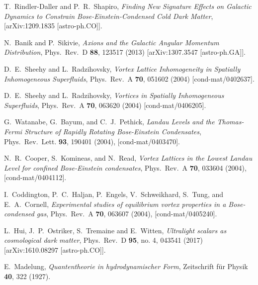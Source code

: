 \documentclass[aps,prd,twocolumn,nofootinbib,superscriptaddress]{revtex4-1}
\begin{document}
\begin{thebibliography}{99}
  T.~Rindler-Daller and P.~R.~Shapiro,
  \emph{Finding New Signature Effects on Galactic Dynamics to Constrain Bose-Einstein-Condensed Cold Dark Matter},
  [arXiv:1209.1835 [astro-ph.CO]].

  N.~Banik and P.~Sikivie,
  \emph{Axions and the Galactic Angular Momentum Distribution},
  Phys.\ Rev.\ D {\bf 88}, 123517 (2013)
  [arXiv:1307.3547 [astro-ph.GA]].
  

  D.~E.~Sheehy and L.~Radzihovsky,
  \emph{Vortex Lattice Inhomogeneity in Spatially Inhomogeneous Superfluids},
  Phys.\ Rev.\ A {\bf 70}, 051602 (2004)
  [cond-mat/0402637].

  D.~E.~Sheehy and L.~Radzihovsky,
  \emph{Vortices in Spatially Inhomogeneous Superfluids},
  Phys.\ Rev.\ A {\bf 70}, 063620 (2004)
  [cond-mat/0406205].
  
  G.~Watanabe, G.~Bayum, and C.~J.~Pethick,
  \emph{Landau Levels and the Thomas-Fermi Structure of Rapidly Rotating Bose-Einstein Condensates},
  Phys.\ Rev.\ Lett. {\bf 93}, 190401 (2004),
  [cond-mat/0403470].
  
  N.~R.~Cooper, S.~Komineas, and N.~Read,
  \emph{Vortex Lattices in the Lowest Landau Level for confined Bose-Einstein condensates},
  Phys.\ Rev.\ A {\bf 70}, 033604 (2004),
  [cond-mat/0404112].
  
  I.~Coddington, P.~C.~Haljan, P.~Engels, V.~Schweikhard, S.~Tung, and E.~A.~Cornell,
  \emph{Experimental studies of equilibrium vortex properties in a Bose-condensed gas},
  Phys.\ Rev.\ A {\bf 70}, 063607 (2004),
  [cond-mat/0405240].
  
  

  L.~Hui, J.~P.~Ostriker, S.~Tremaine and E.~Witten,
  \emph{Ultralight scalars as cosmological dark matter},
  Phys.\ Rev.\ D {\bf 95}, no. 4, 043541 (2017)
  [arXiv:1610.08297 [astro-ph.CO]].
  
	E.~Madelung,
	\emph{Quantentheorie in hydrodynamischer Form},
	Zeitschrift f\"ur Physik {\bf 40}, 322 (1927).


\end{thebibliography}
\end{document}
